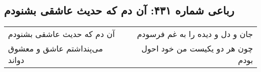 \begin{center}
\section*{رباعی شماره ۴۳۱: آن دم که حدیث عاشقی بشنودم}
\label{sec:sh431}
\begin{longtable}{l p{0.5cm} r}
آن دم که حدیث عاشقی بشنودم
&&
جان و دل و دیده را به غم فرسودم
\\
می‌پنداشتم عاشق و معشوق دواند
&&
چون هر دو یکیست من خود احول بودم
\\
\end{longtable}
\end{center}
